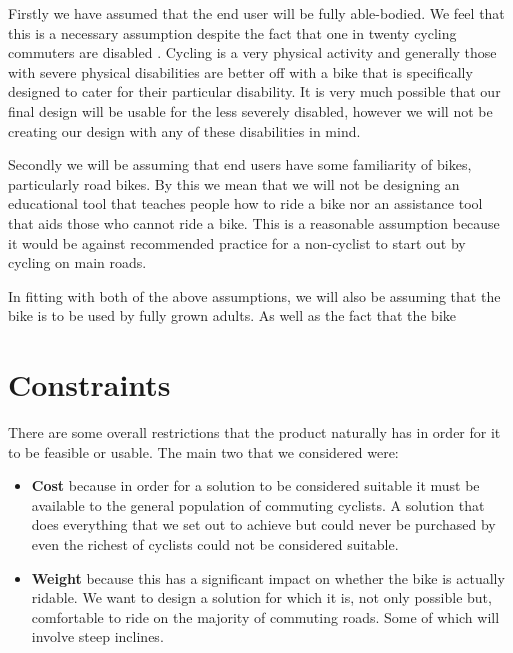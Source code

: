 \documentclass[]{report}
\begin{document}
Firstly we have assumed that the end user will be fully able-bodied. We feel that this is a necessary assumption despite the fact that one in twenty cycling commuters are disabled \citep{census-dis}. Cycling is a very physical activity and generally those with severe physical disabilities are better off with a bike that is specifically designed to cater for their particular disability. It is very much possible that our final design will be usable for the less severely disabled, however we will not be creating our design with any of these disabilities in mind. 

Secondly we will be assuming that end users have some familiarity of bikes, particularly road bikes. By this we mean that we will not be designing an educational tool that teaches people how to ride a bike nor an assistance tool that aids those who cannot ride a bike. This is a reasonable assumption because it would be against recommended practice for a non-cyclist to start out by cycling on main roads.

In fitting with both of the above assumptions, we will also be assuming that the bike is to be used by fully grown adults. As well as the fact that the bike

\section{Constraints}
There are some overall restrictions that the product naturally has in order for it to be feasible or usable. The main two that we considered were:
\begin{itemize}
  \item \textbf{Cost} because in order for a solution to be considered suitable it must be available to the general population of commuting cyclists. A solution that does everything that we set out to achieve but could never be purchased by even the richest of cyclists could not be considered suitable.
  \item \textbf{Weight} because this has a significant impact on whether the bike is actually ridable. We want to design a solution for which it is, not only possible but, comfortable to ride on the majority of commuting roads. Some of which will involve steep inclines.  
\end{itemize}
\end{document}
